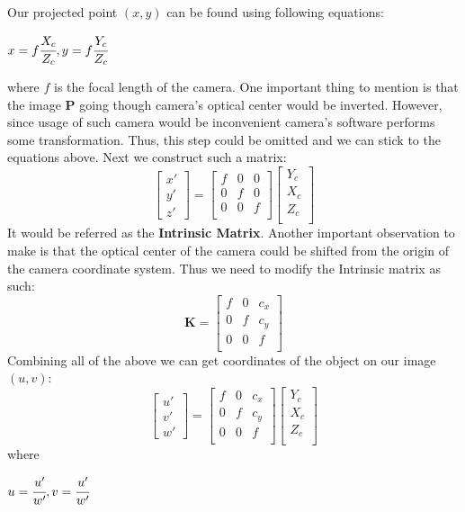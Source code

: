 Our projected point $(x, y)$ can be found using following equations:\\
\begin{center}
    $x = f \cfrac{X_c}{Z_c}, y = f \cfrac{Y_c}{Z_c}$
\end{center}

where $f$ is the focal length of the camera. One important thing to mention is that the image \textbf{P} going though camera's optical center would be inverted. However, since usage of such camera would be inconvenient camera's software performs some transformation. Thus, this step could be omitted and we can stick to the equations above.
Next we construct such a matrix: \\
\[
\begin{bmatrix}
    x' \\
    y' \\
    z'
\end{bmatrix}
=
\begin{bmatrix}
    f & 0 & 0\\
    0 & f & 0 \\
    0 & 0 & f \\
\end{bmatrix}
\begin{bmatrix}
    Y_c \\
    X_c \\
    Z_c \\
\end{bmatrix}
\]
It would be referred as the \textbf{Intrinsic Matrix}.
Another important observation to make is that the optical center of the camera could be shifted from the origin of the camera coordinate system. Thus we need to modify the Intrinsic matrix as such:\\
\[\textbf{K} = \begin{bmatrix}
    f & 0 & c_x\\
    0 & f & c_y \\
    0 & 0 & f \\
\end{bmatrix}\]
Combining all of the above we can get coordinates of the object on our image $(u,v)$:\\
\[
\begin{bmatrix}
    u' \\
    v' \\
    w'
\end{bmatrix}
=
\begin{bmatrix}
    f & 0 & c_x\\
    0 & f & c_y \\
    0 & 0 & f \\
\end{bmatrix}
\begin{bmatrix}
    Y_c \\
    X_c \\
    Z_c \\
\end{bmatrix}
\]
where 
\begin{center}
    $u = \cfrac{u'}{w'}, v = \cfrac{u'}{w'}$
\end{center}

